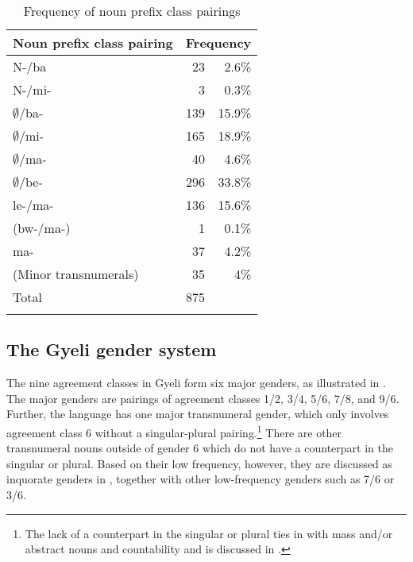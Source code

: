 \begin{table}
\begin{tabular}{l rr}
 \lsptoprule
Noun prefix class pairing	&  \multicolumn{2}{r}{Frequency} \\  \midrule
N-/ba 			& 23 & 2.6\% \\
N-/mi- 			&   3 & 0.3\% \\
$\emptyset$/ba- 	& 139  & 15.9\% \\
$\emptyset$/mi- 	&   165 & 18.9\% \\
$\emptyset$/ma- 	&   40  & 4.6\% \\
$\emptyset$/be- 	&   296 & 33.8\% \\
le-/ma- 			&   136 & 15.6\% \\
(bw-/ma-) 		&    1    & 0.1\% \\
ma- 				&  37   & 4.2\% \\
(Minor transnumerals) & 35  & 4\% \\  \midrule
Total 			& 875 & \\  \lspbottomrule
\end{tabular}
\caption{Frequency of noun prefix class pairings}
\label{Tab:NCpair}
\end{table}





\subsection{The Gyeli gender system}
\label{sec:genders}

The nine agreement classes in Gyeli form six major genders, as illustrated in . The major genders are pairings of agreement classes 1/2, 3/4, 5/6, 7/8, and 9/6. Further, the language has one major transnumeral gender, which only involves agreement class 6 without a singular-plural pairing.\footnote{The lack of a counterpart in the singular or plural ties in with mass and/or abstract nouns and countability and is discussed in .}
There are other transnumeral nouns outside of gender 6 which do not have a counterpart in the singular or plural. Based on their low frequency, however, they are discussed as inquorate genders in , together with other low-frequency genders such as 7/6 or 3/6.

